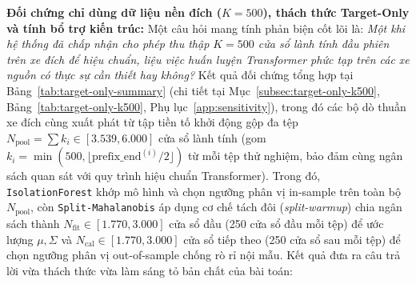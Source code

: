 \documentclass[12pt, a4paper, reqno, oneside]{book}
\DeclareRobustCommand{\code}[1]{\nolinkurl{#1}}
\begin{document}
\noindent\textbf{Đối chứng chỉ dùng dữ liệu nền đích ($K=500$), thách thức Target-Only và tính bổ trợ kiến trúc:} Một câu hỏi mang tính phản biện cốt lõi là: \textit{Một khi hệ thống đã chấp nhận cho phép thu thập $K=500$ cửa sổ lành tính đầu phiên trên xe đích để hiệu chuẩn, liệu việc huấn luyện Transformer phức tạp trên các xe nguồn có thực sự cần thiết hay không?} Kết quả đối chứng tổng hợp tại Bảng~\ref{tab:target-only-summary} (chi tiết tại Mục~\ref{subsec:target-only-k500}, Bảng~\ref{tab:target-only-k500}, Phụ lục~\ref{app:sensitivity}), trong đó các bộ dò thuần xe đích cùng xuất phát từ tập tiền tố khởi động gộp đa tệp $N_{\text{pool}} = \sum k_i \in [3.539, 6.000]$ cửa sổ lành tính (gom $k_i = \min(500, \lfloor\mathrm{prefix\_end}^{(i)}/2\rfloor)$ từ mỗi tệp thử nghiệm, bảo đảm cùng ngân sách quan sát với quy trình hiệu chuẩn Transformer). Trong đó, \code{IsolationForest} khớp mô hình và chọn ngưỡng phân vị in-sample trên toàn bộ $N_{\text{pool}}$, còn \code{Split-Mahalanobis} áp dụng cơ chế tách đôi (\textit{split-warmup}) chia ngân sách thành $N_{\text{fit}} \in [1.770, 3.000]$ cửa sổ đầu (250 cửa sổ đầu mỗi tệp) để ước lượng $\mu, \Sigma$ và $N_{\text{cal}} \in [1.770, 3.000]$ cửa sổ tiếp theo (250 cửa sổ sau mỗi tệp) để chọn ngưỡng phân vị out-of-sample chống rò rỉ nội mẫu. Kết quả đưa ra câu trả lời vừa thách thức vừa làm sáng tỏ bản chất của bài toán:
\end{document}
